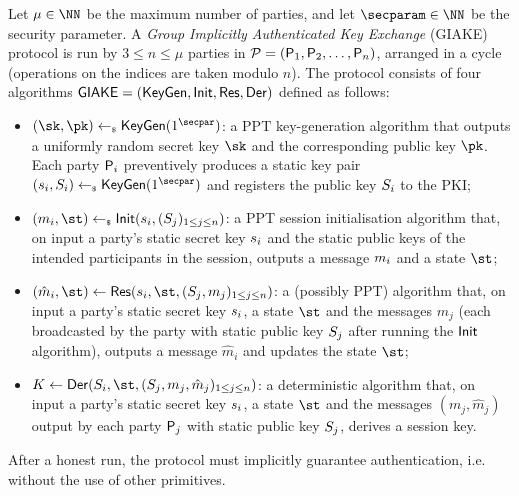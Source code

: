 \begin{plaindef}[GIAKE]\label{def:GKE}
	Let $\projectKey \in \NN$ be the maximum number of parties, and let $\secparam\in \NN$ be the security parameter. 
	A \textit{Group Implicitly Authenticated Key Exchange} (GIAKE) protocol is run by $3\leq n \leq \mu$ parties in $\PartySet = (\Party_1,\allowbreak \Party_2,\dots,\Party_n)$, arranged in a cycle (operations on the indices are taken modulo $n$).
	The protocol consists of four algorithms $\GIAKE = (\KeyGen, \GAKEIni, \GAKERes, \GAKEDer)$ defined as follows:
	\begin{itemize}
		\item $(\sk,\pk) \getsr \KeyGen(1^\secpar)$: a PPT key-generation algorithm that outputs a uniformly random secret key $\sk$ and the corresponding public key $\pk$.
		Each party $\User[i]$ preventively produces a static key pair $(\ssk_i,\spk_i) \getsr \KeyGen(1^\secpar)$ and registers the public key $\spk_i$ to the PKI;
		\item $(m_i,\st) \getsr \GAKEIni (\ssk_i,(\spk_j)_{1\leq j \leq n})$: a PPT session initialisation algorithm that, on input a party's static secret key $\ssk_i$ and the static public keys of the intended participants in the session, outputs a message $\messageIni$ and a state $\st$;
		\item $(\hat{m}_i,\st) \gets \GAKERes(\ssk_i,\st,(\spk_j,m_j)_{1\leq j \leq n})$: a (possibly PPT) algorithm that, on input a party's static secret key $\ssk_i$, a state $\st$ and the messages $m_j$ (each broadcasted by the party with static public key $\spk_j$ after running the $\GAKEIni$ algorithm), outputs a message $\hat{m}_i$ and updates the state $\st$;
		\item $K \gets \GAKEDer (\spk_i,\st,(\spk_j,m_j,\hat{m}_j)_{1\leq j \leq n})$: a deterministic algorithm that,  on input a party's static secret key $\ssk_i$, a state $\st$ and the messages $(m_j,\hat{m}_j)$ output by each party $\User[j]$ with static public key $\spk_j$, derives a session key.
	\end{itemize}
	After a honest run, the protocol must implicitly guarantee authentication, i.e. without the use of other primitives.
\end{plaindef}	

